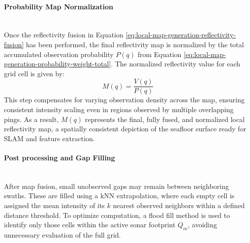 \paragraph{Probability Map Normalization} \mbox{}\\[0.5em] \noindent 
Once the reflectivity fusion in Equation \ref{eq:local-map-generation-reflectivity-fusion} has been performed, the final reflectivity map is normalized by the total accumulated observation probability $P(q)$ from Equation \ref{eq:local-map-generation-probability-weight-total}. The normalized reflectivity value for each grid cell is given by:
\begin{equation}
    M(q) = \frac{V(q)}{P(q)}
    \label{eq:local-map-generation-probability-normalization}
\end{equation}
This step compensates for varying observation density across the map, ensuring consistent intensity scaling even in regions observed by multiple overlapping pings. As a result, $M(q)$ represents the final, fully fused, and normalized local reflectivity map, a spatially consistent depiction of the seafloor surface ready for SLAM and feature extraction.

\paragraph{Post processing and Gap Filling} \mbox{}\\[0.5em] \noindent 
After map fusion, small unobserved gaps may remain between neighboring swaths. These are filled using a kNN extrapolation, where each empty cell is assigned the mean intensity of its $k$ nearest observed neighbors within a defined distance threshold. To optimize computation, a flood fill method is used to identify only those cells within the active sonar footprint $Q_m$, avoiding unnecessary evaluation of the full grid.

\newpage

